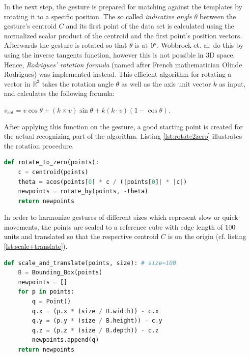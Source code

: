 In the next step, the gesture is prepared for matching against the templates by rotating it to a specific position. The so called \textit{indicative angle} $\theta$ between the gesture's centroid $C$ and its first point of the data set is calculated using the normalized scalar product of the centroid and the first point's position vectors. Afterwards the gesture is rotated so that $\theta$ is at $0\degree$. Wobbrock et. al. do this by using the inverse tangents function, however this is not possible in 3D space. Hence, \textit{Rodrigues' rotation formula} (named after French mathematician Olinde Rodrigues) was implemented instead. This efficient algorithm for rotating a vector in $\mathbb{R}^3$ takes the rotation angle $\theta$ as well as the axis unit vector $k$ as input, and calculates the following formula:

\begin{center}
\(
v_{rot} = v \cos\theta + (k \times v)\sin\theta + k (k \cdot v) (1 - \cos\theta).
\) \cite{koks2006}
\end{center}

After applying this function on the gesture, a good starting point is created for the actual recognizing part of the algorithm. Listing \ref{lst:rotate2zero} illustrates the rotation procedure.

\begin{lstlisting}[label=lst:rotate2zero,language=python,frame=lt,caption=Rotation of points so that their indicative angle is at $0 \degree$]
def rotate_to_zero(points):
	c = centroid(points)
	theta = acos(points[0] * c / (|points[0]| * |c|)
	newpoints = rotate_by(points, -theta)
	return newpoints
\end{lstlisting}

In order to harmonize gestures of different sizes which represent slow or quick movements, the points are scaled to a reference cube with edge length of $100$ units and translated so that the respective centroid $C$ is on the origin (cf. listing \ref{lst:scale+translate}).

\begin{lstlisting}[label=lst:scale+translate,language=python,frame=lt,caption=Scaling to reference cube and translation to origin]
def scale_and_translate(points, size): # size=100
	B = Bounding_Box(points)
	newpoints = []
	for p in points:
		q = Point()
		q.x = (p.x * (size / B.width)) - c.x
		q.y = (p.y * (size / B.height)) - c.y
		q.z = (p.z * (size / B.depth)) - c.z
		newpoints.append(q)
	return newpoints
\end{lstlisting}

